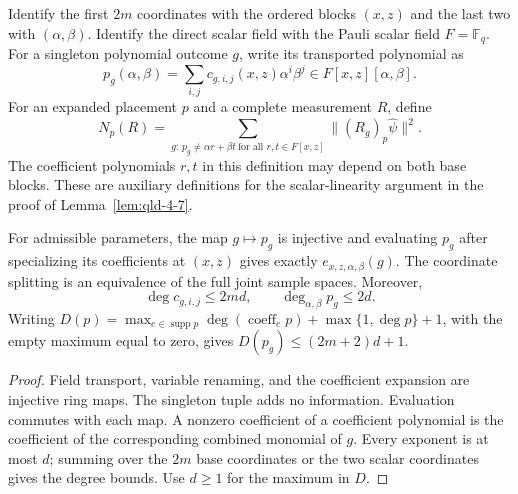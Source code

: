 \begin{definition}
\label{def:qld-scalar-coefficient-expansion}
\leanok
Identify the first $2m$ coordinates with the ordered blocks $(x,z)$ and
the last two with $(\alpha,\beta)$. Identify the direct scalar field with
the Pauli scalar field $F=\mathbb F_q$. For a singleton polynomial outcome
$g$, write its transported polynomial as
\[
 p_g(\alpha,\beta)=\sum_{i,j}c_{g,i,j}(x,z)\alpha^i\beta^j
 \in F[x,z][\alpha,\beta].
\]
For an expanded placement $p$ and a complete measurement $R$, define
\[
 N_p(R)=\sum_{g:\,p_g\ne\alpha r+\beta t\ \text{for all }r,t\in F[x,z]}
   \|(R_g)_p\hat\psi\|^2.
\]
The coefficient polynomials $r,t$ in this definition may depend on both
base blocks. These are auxiliary definitions for the scalar-linearity
argument in the proof of Lemma~\ref{lem:qld-4-7}.
\end{definition}

\begin{theorem}
\label{thm:qld-scalar-expansion-degrees}
\leanok
For admissible parameters, the map $g\mapsto p_g$ is injective and
evaluating $p_g$ after specializing its coefficients at $(x,z)$ gives
exactly $e_{x,z,\alpha,\beta}(g)$. The coordinate splitting is an
equivalence of the full joint sample spaces. Moreover,
\[
 \deg c_{g,i,j}\leq2md,\qquad \deg_{\alpha,\beta}p_g\leq2d.
\]
Writing
$D(p)=\max_{e\in\operatorname{supp}p}\deg(\operatorname{coeff}_e p)
+\max\{1,\deg p\}+1$, with the empty maximum equal to zero, gives
$D(p_g)\leq(2m+2)d+1$.
\end{theorem}
\begin{proof}
\leanok
{}
Field transport, variable renaming, and the coefficient expansion are
injective ring maps. The singleton tuple adds no information. Evaluation
commutes with each map. A nonzero coefficient of a coefficient polynomial
is the coefficient of the corresponding combined monomial of $g$.
Every exponent is at most $d$; summing over the $2m$ base coordinates
or the two scalar coordinates gives the degree bounds. Use $d\geq1$
for the maximum in $D$.
\end{proof}

